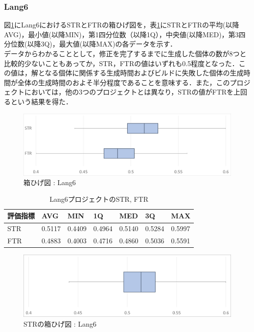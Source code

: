 \documentclass[uplatex,dvipdfmx,a4paper]{jsarticle}
\begin{document}
\subsubsection{Lang6}
図\ref{fig:Lang6_boxplot}にLang6におけるSTRとFTRの箱ひげ図を，表\ref{tab:Lang6}にSTRとFTRの平均(以降AVG)，最小値(以降MIN)，第1四分位数（以降1Q），中央値(以降MED)，第3四分位数(以降3Q)，最大値(以降MAX)の各データを示す．\\
データからわかることとして，修正を完了するまでに生成した個体の数が8つと比較的少ないこともあってか，STR，FTRの値はいずれも0.5程度となった．この値は，解となる個体に関係する生成時間およびビルドに失敗した個体の生成時間が全体の生成時間のおよそ半分程度であることを意味する．また，このプロジェクトにおいては，他の3つのプロジェクトとは異なり，STRの値がFTRを上回るという結果を得た．
\begin{figure}[t]
  \centering
  \includegraphics[width=\linewidth]{fig/Lang6_boxplot.png}
  \caption{箱ひげ図 : Lang6}
  \label{fig:Lang6_boxplot}
\end{figure}
\begin{table}[b]
  \centering
  \caption{Lang6プロジェクトのSTR, FTR}
  \label{tab:Lang6}
  \begin{tabular}{l|llllll} \hline\hline
    評価指標 & AVG         & MIN & 1Q & MED & 3Q & MAX   \\\hline
    STR & 0.5117 & 0.4409 & 0.4964 & 0.5140 & 0.5284 & 0.5997  \\
    FTR & 0.4883 & 0.4003 & 0.4716 & 0.4860 & 0.5036 & 0.5591 \\\hline\hline
  \end{tabular}
\end{table}
\begin{figure}[t]
  \centering
  \includegraphics[width=\linewidth]{fig/Lang6_boxplot_STR.png}
  \caption{STRの箱ひげ図 : Lang6}
  \label{fig:Lang6_boxplot_STR}
\end{figure}
\end{document}

